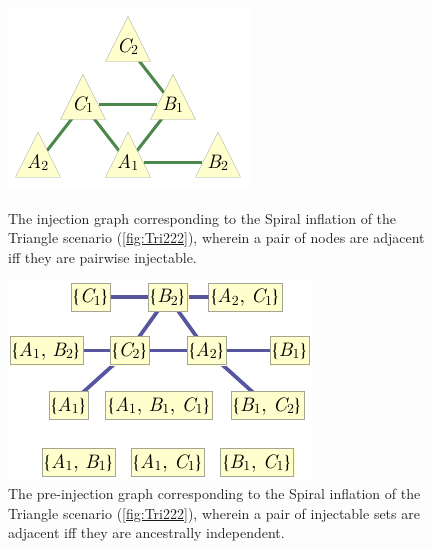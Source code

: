 {\begin{figure}[t]
\centering
\begin{minipage}[t]{0.3\linewidth}
\centering
\includegraphics[scale=1]{injectiongraph222.pdf}
\caption{The injection graph corresponding to the Spiral inflation of the Triangle scenario (\cref{fig:Tri222}), wherein a pair of nodes are adjacent iff they are pairwise injectable.}\label{fig:injection222}
\end{minipage}
\hfill
\begin{minipage}[t]{0.3\linewidth}
\centering
\includegraphics[scale=1]{preinjectiongraph222.pdf}
\caption{The pre-injection graph corresponding to the  Spiral inflation of the Triangle scenario (\cref{fig:Tri222}), wherein a pair of injectable sets are adjacent iff they are ancestrally independent. }\label{fig:preinjectiongraph222}
\end{minipage}
\hfill
\begin{minipage}[t]{0.3\linewidth}
\centering

\end{minipage}
\end{figure}}
